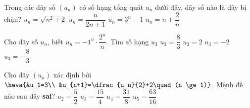 \begin{ex}%
	Trong các dãy số $(u_n)$ có số hạng tổng quát $u_n$  dưới đây, dãy số nào là dãy bị chặn?
	\choice 
		{$u_n = \sqrt{n^2  + 2}$}
		{\True $u_n =  \dfrac{n}{2n+1}$}
		{$u_n = 3^n  - 1$}
		{$u_n = n  + \dfrac{2}{n}$}
\end{ex}

\begin{ex}%
	Cho dãy  số $u_n$, biết $u_n=-1^n \cdot \dfrac{2^n}{n}$. Tìm số hạng $u_3$
	\choice 
		{$u_3=\dfrac{8}{3}$} 
		{$u_3=2$} 
		{$u_3=-2$} 
		 {\True $u_3=-\dfrac{8}{3}$}
\end{ex}

\begin{ex}%
	Cho  dãy $(u_n)$ xác định bởi $\heva{&u_1=3\\
	&u_{n+1}=\dfrac{u_n}{2}+2\quad (n \ge 1)}$. Mệnh đề nào sau đây  \textbf{sai}?
	 \choice
		 {\True $u_2=\dfrac{5}{2}$}
		{$u_3=\dfrac{15}{4}$} 
		{$u_4=\dfrac{31}{8}$} 
		{$u_5=\dfrac{63}{16}$} 
\end{ex}

